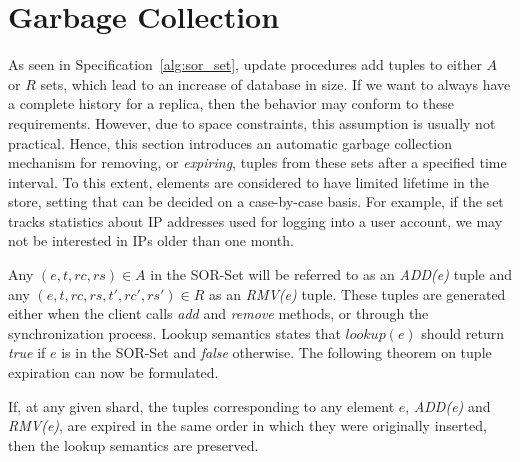 \section{Garbage Collection}
\label{sec:garbage_collection}

As seen in Specification~\ref{alg:sor_set}, update procedures add tuples to
either $A$ or $R$ sets, which lead to an increase of database in size. If we
want to always have a complete history for a replica, then the behavior may
conform to these requirements. However, due to space constraints, this
assumption is usually not practical. Hence, this section introduces an automatic
garbage collection mechanism for removing, or \textit{expiring}, tuples from
these sets after a specified time interval. To this extent, elements are
considered to have limited lifetime in the store, setting that can be decided on
a case-by-case basis. For example, if the set tracks statistics about IP
addresses used for logging into a user account, we may not be interested in IPs
older than one month.

Any $(e, t, rc, rs) \in A$ in the SOR-Set will be referred to as an
\textit{ADD(e)} tuple and any $(e, t, rc, rs, t', rc', rs') \in R$ as an
\textit{RMV(e)} tuple. These tuples are generated either when the client calls
\textit{add} and \textit{remove} methods, or through the synchronization
process. Lookup semantics states that $\textit{lookup}(e)$ should return
\textit{true} if $e$ is in the SOR-Set and \textit{false} otherwise. The
following theorem on tuple expiration can now be formulated.

\begin{theorem}
\begin{itshape}
If, at any given shard, the tuples corresponding to any element $e$,
\textit{ADD(e)} and \textit{RMV(e)}, are expired in the same order in which they
were originally inserted, then the lookup semantics are preserved.
\end{itshape}
\end{theorem}

